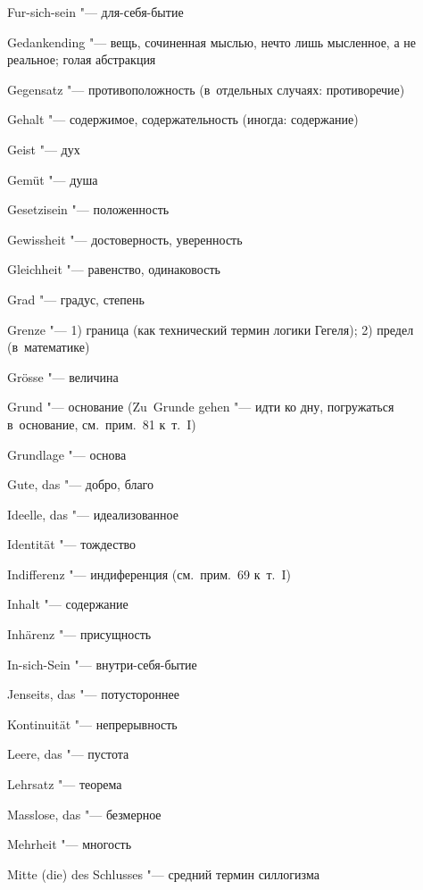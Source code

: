 \begin{multicols}{2}
Fur-sich-sein "--- для-себя-бытие

\bigskip

Gedank\-ending "--- вещь, сочиненная мыслью, нечто лишь мысленное,
а не реальное; голая абстракция

Gegen\-satz "--- противоположность (в~отдельных случаях:
противоречие)

Gehalt "--- содержимое, содержательность (иногда: содержание)

Geist "--- дух

Gemüt "--- душа

Gesetzi\-sein "--- положенность

Gewiss\-heit "--- достоверность, уверенность

Gleich\-heit "--- равенство, одинаковость

Grad "--- градус, степень

Grenze "--- 1) граница (как технический термин логики Гегеля); 2) предел
(в~математике)

Grösse "--- величина

Grund "--- основание (Zu~Grunde gehen "--- идти ко дну,
погружаться в~основание, см.~прим.~81 к~т.~I)

Grundlage "--- основа

Gute, das "--- добро, благо

\bigskip

Ideelle, das "--- идеализованное

Identität "--- тождество

Indiffe\-renz "--- индиференция (см.~прим.~69 к~т.~I)

Inhalt "--- содержание

Inhärenz "--- присущность

In-sich-Sein "--- внутри-себя-бытие

\bigskip

Jenseits, das "--- потустороннее

\bigskip

Kontinui\-tät "--- непрерывность

\bigskip

Leere, das "--- пустота

Lehrsatz "--- теорема

\bigskip

Masslose, das "--- безмерное

Mehrheit "--- многость

Mitte (die) des Schlusses "--- средний термин силлогизма

\bigskip


\end{multicols}

